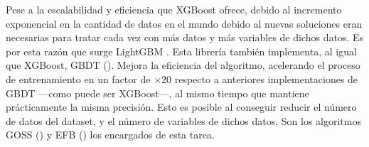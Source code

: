 Pese a la escalabilidad  y eficiencia que XGBoost ofrece, debido al incremento exponencial en la cantidad de datos en el mundo debido al  nuevas soluciones eran necesarias para tratar cada vez con más datos y más variables de dichos datos. Es por esta razón que surge LightGBM \parencite{lightGBM}. Esta librería también implementa, al igual que XGBoost, GBDT (). Mejora la eficiencia del algoritmo, acelerando el proceso de entrenamiento en un factor de $\times20$ respecto a anteriores implementaciones de GBDT ---como puede ser  XGBoost---, al mismo tiempo que mantiene prácticamente la misma precisión. Esto es posible al conseguir reducir el número de datos del dataset, y el número de variables de dichos datos. Son los algoritmos GOSS () y EFB () los encargados de esta tarea.
